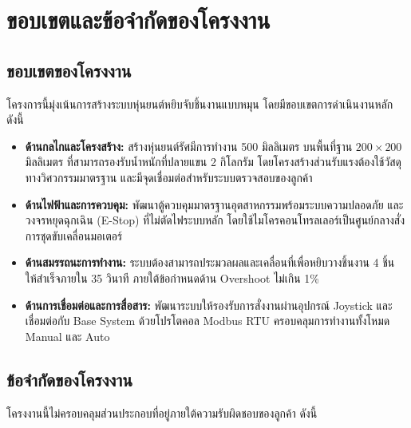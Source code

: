\section{ขอบเขตและข้อจำกัดของโครงงาน}
\label{sec:scope}

\subsection{ขอบเขตของโครงงาน}
\label{subsec:project_scope}

โครงการนี้มุ่งเน้นการสร้างระบบหุ่นยนต์หยิบจับชิ้นงานแบบหมุน
โดยมีขอบเขตการดำเนินงานหลัก ดังนี้

\begin{itemize}
  \item \textbf{ด้านกลไกและโครงสร้าง:}
        สร้างหุ่นยนต์รัศมีการทำงาน 500 มิลลิเมตร บนพื้นที่ฐาน $200 \times 200$ มิลลิเมตร
        ที่สามารถรองรับน้ำหนักที่ปลายแขน 2 กิโลกรัม
        โดยโครงสร้างส่วนรับแรงต้องใช้วัสดุทางวิศวกรรมมาตรฐาน
        และมีจุดเชื่อมต่อสำหรับระบบตรวจสอบของลูกค้า

  \item \textbf{ด้านไฟฟ้าและการควบคุม:}
        พัฒนาตู้ควบคุมมาตรฐานอุตสาหกรรมพร้อมระบบความปลอดภัย
        และวงจรหยุดฉุกเฉิน (E-Stop) ที่ไม่ตัดไฟระบบหลัก
        โดยใช้ไมโครคอนโทรลเลอร์เป็นศูนย์กลางสั่งการชุดขับเคลื่อนมอเตอร์

  \item \textbf{ด้านสมรรถนะการทำงาน:}
        ระบบต้องสามารถประมวลผลและเคลื่อนที่เพื่อหยิบวางชิ้นงาน 4 ชิ้น
        ให้สำเร็จภายใน 35 วินาที ภายใต้ข้อกำหนดด้าน Overshoot ไม่เกิน 1\%

  \item \textbf{ด้านการเชื่อมต่อและการสื่อสาร:}
        พัฒนาระบบให้รองรับการสั่งงานผ่านอุปกรณ์ Joystick
        และเชื่อมต่อกับ Base System ด้วยโปรโตคอล Modbus RTU
        ครอบคลุมการทำงานทั้งโหมด Manual และ Auto
\end{itemize}

\subsection{ข้อจำกัดของโครงงาน}
\label{subsec:limitations}

โครงงานนี้ไม่ครอบคลุมส่วนประกอบที่อยู่ภายใต้ความรับผิดชอบของลูกค้า ดังนี้


